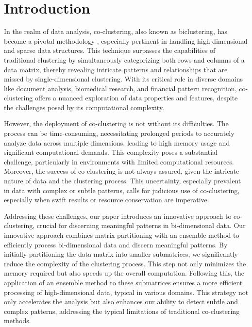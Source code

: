 
\section{Introduction}

In the realm of data analysis, co-clustering, also known as biclustering, has become a pivotal methodology \cite{kluger2003SpectralBiclusteringMicroarray}, especially pertinent in handling high-dimensional and sparse data structures\cite{chi2020ProvableConvexCoclustering, dhillon2003InformationtheoreticCoclustering, yan2017CoclusteringMultidimensionalBig}. This technique surpasses the capabilities of traditional clustering by simultaneously categorizing both rows and columns of a data matrix, thereby revealing intricate patterns and relationships that are missed by single-dimensional clustering. With its critical role in diverse domains like document analysis, biomedical research, and financial pattern recognition, co-clustering offers a nuanced exploration of data properties and features, despite the challenges posed by its computational complexity.

However, the deployment of co-clustering is not without its difficulties. The process can be time-consuming, necessitating prolonged periods to accurately analyze data across multiple dimensions, leading to high memory usage and significant computational demands. This complexity poses a substantial challenge, particularly in environments with limited computational resources. Moreover, the success of co-clustering is not always assured, given the intricate nature of data and the clustering process. This uncertainty, especially prevalent in data with complex or subtle patterns, calls for judicious use of co-clustering, especially when swift results or resource conservation are imperative.

Addressing these challenges, our paper introduces an innovative approach to co-clustering, crucial for discerning meaningful patterns in bi-dimensional data. Our innovative approach combines matrix partitioning with an ensemble method to efficiently process bi-dimensional data and discern meaningful patterns. By initially partitioning the data matrix into smaller submatrices, we significantly reduce the complexity of the clustering process. This step not only minimizes the memory required but also speeds up the overall computation. Following this, the application of an ensemble method to these submatrices ensures a more efficient processing of high-dimensional data, typical in various domains. This strategy not only accelerates the analysis but also enhances our ability to detect subtle and complex patterns, addressing the typical limitations of traditional co-clustering methods.

